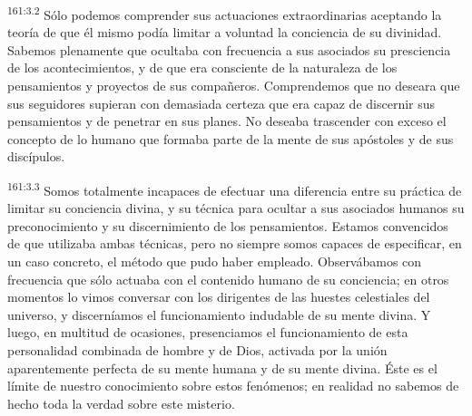 \par 
\textsuperscript{161:3.2} Sólo podemos comprender sus actuaciones extraordinarias aceptando la teoría de que él mismo podía limitar a voluntad la conciencia de su divinidad. Sabemos plenamente que ocultaba con frecuencia a sus asociados su presciencia de los acontecimientos, y de que era consciente de la naturaleza de los pensamientos y proyectos de sus compañeros. Comprendemos que no deseara que sus seguidores supieran con demasiada certeza que era capaz de discernir sus pensamientos y de penetrar en sus planes. No deseaba trascender con exceso el concepto de lo humano que formaba parte de la mente de sus apóstoles y de sus discípulos.

\par 
\textsuperscript{161:3.3} Somos totalmente incapaces de efectuar una diferencia entre su práctica de limitar su conciencia divina, y su técnica para ocultar a sus asociados humanos su preconocimiento y su discernimiento de los pensamientos. Estamos convencidos de que utilizaba ambas técnicas, pero no siempre somos capaces de especificar, en un caso concreto, el método que pudo haber empleado. Observábamos con frecuencia que sólo actuaba con el contenido humano de su conciencia; en otros momentos lo vimos conversar con los dirigentes de las huestes celestiales del universo, y discerníamos el funcionamiento indudable de su mente divina. Y luego, en multitud de ocasiones, presenciamos el funcionamiento de esta personalidad combinada de hombre y de Dios, activada por la unión aparentemente perfecta de su mente humana y de su mente divina. Éste es el límite de nuestro conocimiento sobre estos fenómenos; en realidad no sabemos de hecho toda la verdad sobre este misterio.